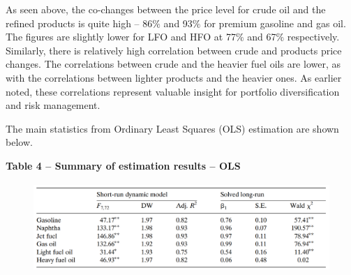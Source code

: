 \documentclass[12pt,twoside]{article}
\begin{document}

\begin{justify}
{\fontsize{11pt}{13.2pt}\selectfont \par}
\end{justify}\par

\begin{justify}
{\fontsize{11pt}{13.2pt}\selectfont As seen above, the co-changes between the price level for crude oil and the refined products is quite high – 86$\%$  and 93$\%$  for premium gasoline and gas oil. The figures are slightly lower for LFO and HFO at 77$\%$  and 67$\%$  respectively. Similarly, there is relatively high correlation between crude and products price changes. The correlations between crude and the heavier fuel oils are lower, as with the correlations between lighter products and the heavier ones. As earlier noted, these correlations represent valuable insight for portfolio diversification and risk management.\par}
\end{justify}\par

\begin{justify}
{\fontsize{11pt}{13.2pt}\selectfont The main statistics from Ordinary Least Squares (OLS) estimation are shown below.\par}
\end{justify}\par

\begin{Center}
{\fontsize{11pt}{13.2pt}\selectfont \textbf{Table 4 – Summary of estimation results – OLS}\par}
\end{Center}\par




\begin{figure}[H]
	\begin{Center}
		\includegraphics[width=5.05in,height=1.33in]{./media/image6.png}
	\end{Center}
\end{figure}
\end{document}
